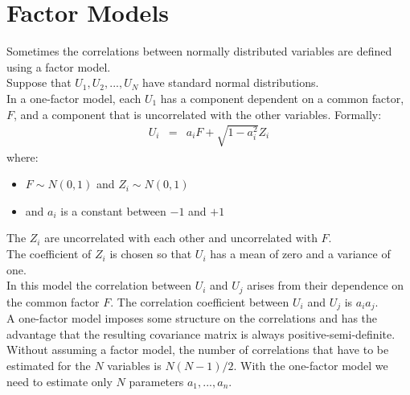 \section{Factor Models}
Sometimes the correlations between normally distributed variables are defined using a factor model.\\
Suppose that $U_{1}, U_{2}, ..., U_{N}$ have standard normal distributions.\\
In a one-factor model, each $U_{1}$ has a component dependent on a common factor, $F$, and a component that is uncorrelated with the other variables. Formally:
\begin{eqnarray}
	U_{i} &=& a_{i} F + \sqrt{1 - a_{i}^{2}}Z_{i}
\end{eqnarray}
where:
\begin{itemize}
	\item $F\sim N(0, 1)$ and $Z_{i}\sim N(0, 1)$
	\item and $a_{i}$ is a constant between $-1$ and $+1$
\end{itemize}
The $Z_{i}$ are uncorrelated with each other and uncorrelated with $F$.\\
The coefficient of $Z_{i}$ is chosen so that $U_{i}$ has a mean of zero and a variance of one.\\
In this model the correlation between $U_{i}$ and $U_{j}$ arises from their dependence on the common factor $F$. The correlation coefficient between $U_{i}$ and $U_{j}$ is $a_{i}a_{j}$.\\
A one-factor model imposes some structure on the correlations and has the advantage that the resulting covariance matrix is always positive-semi-definite. Without assuming a factor model, the number of correlations that have to be estimated for the $N$ variables is $N(N - 1) / 2$. With the one-factor model we need to estimate only $N$ parameters $a_{1}, ..., a_{n}$.
